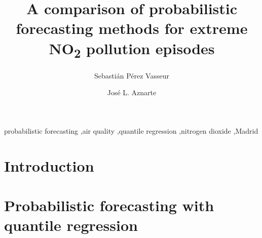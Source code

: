 \documentclass[a4paper,twocolumn,5p]{elsarticle}
\begin{document}
\newcommand{\no}{NO\textsubscript{2}\xspace}

\begin{frontmatter}

\title{A comparison of probabilistic forecasting methods for extreme \no pollution episodes}

\author{Sebasti\'an P\'erez Vasseur}
\address{Artificial Intelligence Department\\Universidad Nacional de
  Educaci\'on a Distancia --- UNED\\c/ Juan del Rosal, 16, Madrid, Spain}

\author{Jos\'e L. Aznarte}
\address{Artificial Intelligence Department\\Universidad Nacional de
  Educaci\'on a Distancia --- UNED\\c/ Juan del Rosal, 16, Madrid, Spain}



\begin{abstract}

\end{abstract}

\begin{keyword}
probabilistic forecasting \sep air quality \sep quantile regression
\sep nitrogen dioxide \sep Madrid
\end{keyword}

\end{frontmatter}


\section{Introduction}
\label{sec:intro}



\section{Probabilistic forecasting with quantile regression}
\label{sec:probForec}
\end{document}
